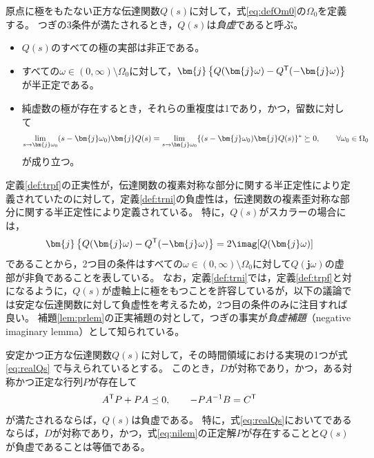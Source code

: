 \documentclass[tombow,dvipdfmx]{corona-a5}
\begin{document}
\begin{定義}\label{def:trni}
原点に極をもたない正方な伝達関数$Q(s)$に対して，式\ref{eq:defOm0}の$\Omega_0$を定義する。
つぎの3条件が満たされるとき，$Q(s)$は\emph{負虚}であると呼ぶ。
\begin{itemize}
\item $Q(s)$のすべての極の実部は非正である。
\item すべての$\omega \in (0,\infty)\setminus \Omega_0$に対して，$\bm{j}\left\{Q(\bm{j} \omega) - Q^{\sf T}(-\bm{j} \omega) \right\}$が半正定である。
\item 純虚数の極が存在するとき，それらの重複度は1であり，かつ，留数に対して
\begin{align*}
\lim_{s \rightarrow \bm{j} \omega_0} (s-\bm{j} \omega_0) \bm{j} Q(s) = 
\lim_{s\rightarrow \bm{j} \omega_0} \{ (s-\bm{j} \omega_0) \bm{j} Q(s)\}^{\sf *}\succeq 0
,\qquad
\forall \omega_0 \in \Omega_0
\end{align*}
が成り立つ。
\end{itemize}
\end{定義}

定義\ref{def:trpf}の正実性が，伝達関数の複素対称な部分に関する半正定性により定義されていたのに対して，定義\ref{def:trni}の負虚性は，伝達関数の複素歪対称な部分に関する半正定性により定義されている。
特に，$Q(s)$がスカラーの場合には，
\begin{align*}
\bm{j}\left\{Q(\bm{j} \omega) - Q^{\sf T}(-\bm{j} \omega) \right\}
= 2 \imag[Q(\bm{j} \omega)]
\end{align*}
であることから，2つ目の条件はすべての$\omega \in (0,\infty)\setminus \Omega_0$に対して$Q(\bm{j}\omega)$の虚部が非負であることを表している。
なお，定義\ref{def:trni}では，定義\ref{def:trpf}と対になるように，$Q(s)$が虚軸上に極をもつことを許容しているが，以下の議論では安定な伝達関数に対して負虚性を考えるため，2つ目の条件のみに注目すれば良い。
補題\ref{lem:prlem}の正実補題の対として，つぎの事実が\emph{負虚補題}（negative imaginary lemma）として知られている。

\begin{補題}\label{lem:nilem}
安定かつ正方な伝達関数$Q(s)$に対して，その時間領域における実現の1つが式\ref{eq:realQs}
で与えられているとする。
このとき，$D$が対称であり，かつ，ある対称かつ正定な行列$P$が存在して
\begin{align}\label{eq:nilem}
A^{\sf T}P+PA \preceq 0
,\qquad
-PA^{-1}B = C^{\sf T}
\end{align}
が満たされるならば，$Q(s)$は負虚である。
特に，式\ref{eq:realQs}においてであるならば，$D$が対称であり，かつ，式\ref{eq:nilem}の正定解$P$が存在することと$Q(s)$が負虚であることは等価である。
\end{補題}
\end{document}
